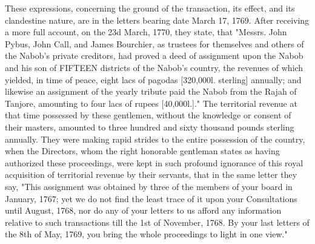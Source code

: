 These expressions, concerning the ground of the transaction, its effect, and its clandestine nature, are in the letters bearing date March 17, 1769. After receiving a more full account, on the 23d March, 1770, they state, that "Messrs. John Pybus, John Call, and James Bourchier, as trustees for themselves and others of the Nabob's private creditors, had proved a deed of assignment upon the Nabob and his son of FIFTEEN districts of the Nabob's country, the revenues of which yielded, in time of peace, eight lacs of pagodas [320,000l. sterling] annually; and likewise an assignment of the yearly tribute paid the Nabob from the Rajah of Tanjore, amounting to four lacs of rupees [40,000l.]." The territorial revenue at that time possessed by these gentlemen, without the knowledge or consent of their masters, amounted to three hundred and sixty thousand pounds sterling annually. They were making rapid strides to the entire possession of the country, when the Directors, whom the right honorable gentleman states as having authorized these proceedings, were kept in such profound ignorance of this royal acquisition of territorial revenue by their servants, that in the same letter they say, "This assignment was obtained by three of the members of your board in January, 1767; yet we do not find the least trace of it upon your Consultations until August, 1768, nor do any of your letters to us afford any information relative to such transactions till the 1st of November, 1768. By your last letters of the 8th of May, 1769, you bring the whole proceedings to light in one view."

